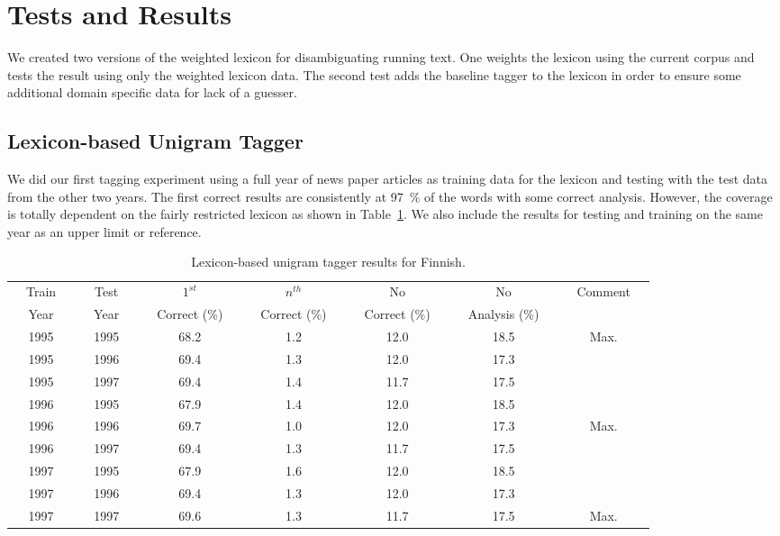 \documentclass[a4paper]{article}
\begin{document}
\section{Tests and  Results}
\label{Sect5}

We created two versions of the weighted lexicon for disambiguating
running text. One weights the lexicon using the current corpus and
tests the result using only the weighted lexicon data. The second test
adds the baseline tagger to the lexicon in order to ensure some
additional domain specific data for lack of a guesser.

\subsection{Lexicon-based Unigram Tagger}

We did our first tagging experiment using a full year of news paper
articles as training data for the lexicon and testing with the test
data from the other two years. The first correct results are
consistently at 97~\% of the words with some correct
analysis. However, the coverage is totally dependent on the fairly
restricted lexicon as shown in Table~\ref{tab:taggerresults1}. We also
include the results for testing and training on the same year as an
upper limit or reference.

\begin{table}[h!]
  \centering
  \caption{Lexicon-based unigram tagger results for Finnish.
  }\label{tab:taggerresults1}
  \begin{scriptsize}
    \begin{tabular}{c|c|c|c|c|c|c}
      \hline
      ~~Train~~ & ~~Test~~ & ~~$1^{st}$~~& ~~$n^{th}$~~ & ~~No~~ & ~~No~~ & ~~Comment~~\\
      ~~Year~~ & ~~Year~~ & ~~Correct (\%)~~ & ~~Correct (\%)~~ & ~~Correct (\%)~~ & ~~Analysis (\%)~~ \\
      \hline 
      1995 & 1995 & 68.2 & 1.2 & 12.0 & 18.5 & ~~Max.~~\\
      1995 & 1996 & 69.4 & 1.3 & 12.0 & 17.3 & \\
      1995 & 1997 & 69.4 & 1.4 & 11.7 & 17.5 & \\
      \hline 
      1996 & 1995 & 67.9 & 1.4 & 12.0 & 18.5 & \\
      1996 & 1996 & 69.7 & 1.0 & 12.0 & 17.3 & ~~Max.~~\\
      1996 & 1997 & 69.4 & 1.3 & 11.7 & 17.5 & \\
      \hline 
      1997 & 1995 & 67.9 & 1.6 & 12.0 & 18.5 & \\
      1997 & 1996 & 69.4 & 1.3 & 12.0 & 17.3 & \\
      1997 & 1997 & 69.6 & 1.3 & 11.7 & 17.5 & ~~Max.~~\\
      \hline 
    \end{tabular}
  \end{scriptsize}
\end{table}
\end{document}

